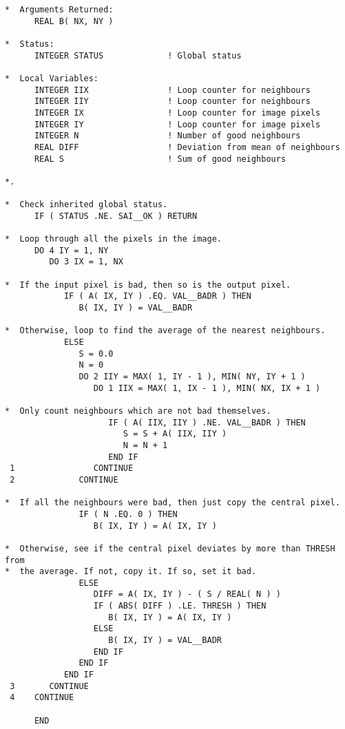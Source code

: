 \begin{verbatim}
*  Arguments Returned:
      REAL B( NX, NY )

*  Status:
      INTEGER STATUS             ! Global status

*  Local Variables:
      INTEGER IIX                ! Loop counter for neighbours
      INTEGER IIY                ! Loop counter for neighbours
      INTEGER IX                 ! Loop counter for image pixels
      INTEGER IY                 ! Loop counter for image pixels
      INTEGER N                  ! Number of good neighbours
      REAL DIFF                  ! Deviation from mean of neighbours
      REAL S                     ! Sum of good neighbours

*.

*  Check inherited global status.
      IF ( STATUS .NE. SAI__OK ) RETURN

*  Loop through all the pixels in the image.
      DO 4 IY = 1, NY
         DO 3 IX = 1, NX

*  If the input pixel is bad, then so is the output pixel.
            IF ( A( IX, IY ) .EQ. VAL__BADR ) THEN
               B( IX, IY ) = VAL__BADR

*  Otherwise, loop to find the average of the nearest neighbours.
            ELSE
               S = 0.0
               N = 0
               DO 2 IIY = MAX( 1, IY - 1 ), MIN( NY, IY + 1 )
                  DO 1 IIX = MAX( 1, IX - 1 ), MIN( NX, IX + 1 )

*  Only count neighbours which are not bad themselves.
                     IF ( A( IIX, IIY ) .NE. VAL__BADR ) THEN
                        S = S + A( IIX, IIY )
                        N = N + 1
                     END IF
 1                CONTINUE
 2             CONTINUE

*  If all the neighbours were bad, then just copy the central pixel.
               IF ( N .EQ. 0 ) THEN
                  B( IX, IY ) = A( IX, IY )

*  Otherwise, see if the central pixel deviates by more than THRESH from
*  the average. If not, copy it. If so, set it bad.
               ELSE
                  DIFF = A( IX, IY ) - ( S / REAL( N ) )
                  IF ( ABS( DIFF ) .LE. THRESH ) THEN
                     B( IX, IY ) = A( IX, IY )
                  ELSE
                     B( IX, IY ) = VAL__BADR
                  END IF
               END IF
            END IF
 3       CONTINUE
 4    CONTINUE

      END
\end{verbatim}
\normalsize

